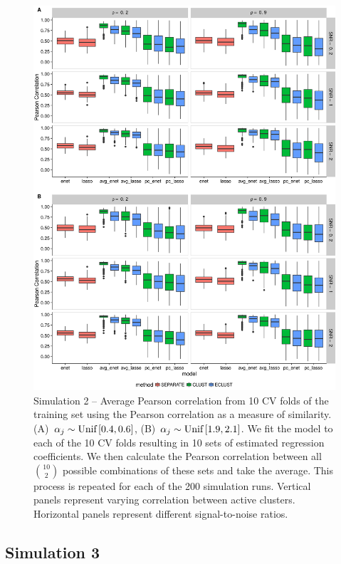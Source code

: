 \begin{figure}[H]
	\centering
	\includegraphics[scale=0.55, keepaspectratio]{./figs/hydra/results/figures/sim2-sept8/pearson_Correlation_sim2.png}
	\caption{Simulation 2 -- Average Pearson correlation from 10 CV folds of the training set using the Pearson correlation as a measure of similarity. \mbox{(A) $\alpha_{j} \sim \textrm{{Unif}}\left[0.4, 0.6\right]$}, \mbox{(B) $\alpha_{j} \sim \textrm{{Unif}}\left[1.9, 2.1\right]$}. We fit the model to each of the 10 CV folds resulting in 10 sets of estimated regression coefficients. We then calculate the Pearson correlation between all $\binom{10}{2}$ possible combinations of these sets and take the average. This process is repeated for each of the 200 simulation runs. Vertical panels represent varying correlation between active clusters. Horizontal panels represent different signal-to-noise ratios.}
	\label{fig:pearson_Correlation_sim2}
\end{figure}



\subsection*{Simulation 3}

